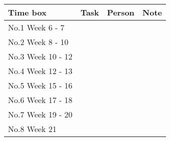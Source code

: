 \begin{table}
	\begin{tabular}{|l|c|c|c|}
		\hline
		Time box			&	Task			&			Person			&			Note \\\hline
		No.1 Week 6 - 7 	& 					&							&				 \\\hline
		No.2 Week 8 - 10	& 					&							&				 \\\hline
		No.3 Week 10 - 12	& 					&							&				 \\\hline
		No.4 Week 12 - 13	& 					&							&				 \\\hline
		No.5 Week 15 - 16	& 					&							&				 \\\hline
		No.6 Week 17 - 18	& 					&							&				 \\\hline
		No.7 Week 19 - 20	& 					&							&				 \\\hline
		No.8 Week 21	 	& 					&							&				 \\\hline
	\end{tabular}
\end{table}